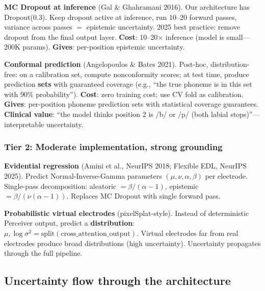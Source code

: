 \documentclass[11pt,letterpaper]{article}
\begin{document}
\textbf{MC Dropout at inference} (Gal \& Ghahramani 2016). Our architecture has Dropout(0.3). Keep dropout active at inference, run 10--20 forward passes, variance across passes $=$ epistemic uncertainty. 2025 best practice: remove dropout from the final output layer. \textbf{Cost}: 10--20$\times$ inference (model is small---200K params). \textbf{Gives}: per-position epistemic uncertainty.

\textbf{Conformal prediction} (Angelopoulos \& Bates 2021). Post-hoc, distribution-free: on a calibration set, compute nonconformity scores; at test time, produce prediction \textbf{sets} with guaranteed coverage (e.g., ``the true phoneme is in this set with 90\% probability''). \textbf{Cost}: zero training cost; use CV fold as calibration. \textbf{Gives}: per-position phoneme prediction sets with statistical coverage guarantees. \textbf{Clinical value}: ``the model thinks position 2 is /b/ or /p/ (both labial stops)''---interpretable uncertainty.

\subsubsection{Tier 2: Moderate implementation, strong grounding}

\textbf{Evidential regression} (Amini et al., NeurIPS 2018; Flexible EDL, NeurIPS 2025). Predict Normal-Inverse-Gamma parameters $(\mu, \nu, \alpha, \beta)$ per electrode. Single-pass decomposition: aleatoric $= \beta/(\alpha{-}1)$, epistemic $= \beta/(\nu(\alpha{-}1))$. Replaces MC Dropout with single forward pass.

\textbf{Probabilistic virtual electrodes} (pixelSplat-style). Instead of deterministic Perceiver output, predict a \textbf{distribution}: $\mu, \log\sigma^2 = \text{split}(\text{cross\_attention\_output})$. Virtual electrodes far from real electrodes produce broad distributions (high uncertainty). Uncertainty propagates through the full pipeline.

\subsection{Uncertainty flow through the architecture}
\end{document}

